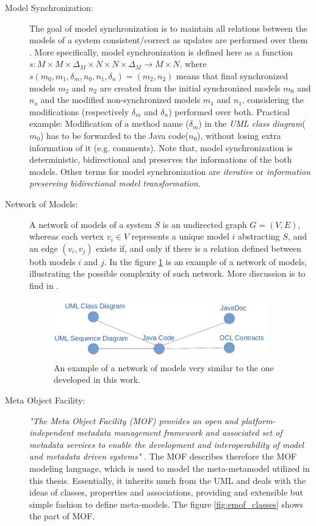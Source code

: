 \documentclass[tuberlin,cic,tc,english,noabntcite]{iiufrgs}
\begin{document}
\begin{description}
	\item[Model Synchronization:] The goal of model synchronization is to maintain all relations between the models of a system consistent/correct as updates are performed over them \cite{diskin2011model}. More specifically, model synchronization is defined here as a function $s : M \times M \times \Delta_M \times N \times N \times \Delta_M \rightarrow M \times N $, where $s(m_0,m_1,\delta_m,n_0,n_1,\delta_n) = (m_2,n_2)$ means that final synchronized models $m_2$ and $n_2$ are created from the initial synchronized models $m_0$ and $n_o$ and the modified non-synchronized models $m_1$ and $n_1$, considering the modifications (respectively $\delta_m$ and $\delta_n$) performed over both. Practical example: Modification of a method name ($\delta_m$) in the \emph{UML class diagram}($m_0$) has to be forwarded to the Java code($n_0$), without losing extra information of it (e.g. comments). Note that, model synchronization is deterministic, bidirectional and preserves the informations of the both models. Other terms for model synchronization are \emph{iterative} or \emph{information preserving bidirectional model transformation}.

	\item[Network of Models:] A network of models of a system $S$ is an undirected graph $G = (V,E)$, whereas each vertex $v_i \in V$ represents a unique model $i$ abstracting $S$, and an edge $(v_i, v_j)$ exists if, and only if there is a relation defined between both models $i$ and $j$. In the figure \ref{fig:network_example_01} is an example of a network of models, illustrating the possible complexity of such network. More discussion is to find in \citet{mens2006taxonomy}.

	\begin{figure}[h]
	    \caption{An example of a network of models very similar to the one developed in this work.}
	    \begin{center}
	        \includegraphics[width=25em]{network_example_01}   
	    \end{center}
	    \label{fig:network_example_01}
	\end{figure}

	\item[Meta Object Facility:] \emph{"The Meta Object Facility (MOF) provides an open and platform-independent metadata management framework and associated set of metadata services to enable the development and interoperability of model and metadata driven systems"} \citep{omg2015meta}. The MOF describes therefore the MOF modeling language, which is used to model the meta-metamodel utilized in this thesis. Essentially, it inherits much from the UML and deals with the ideas of classes, properties and associations, providing and extensible but simple fashion to define meta-models. The figure \ref{fig:emof_classes} shows the part of MOF.


\end{description}
\end{document}
